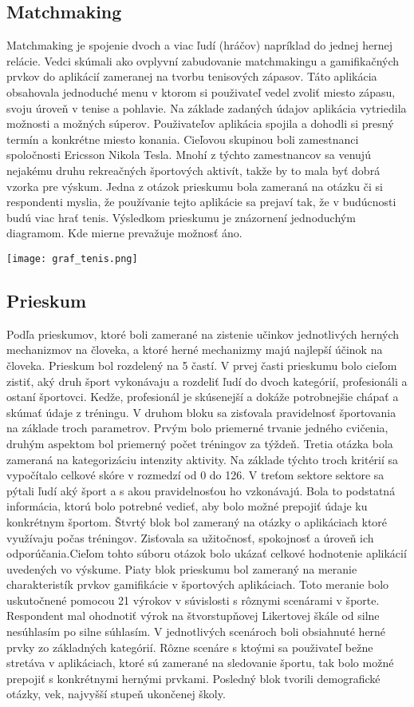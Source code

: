 \documentclass[10pt,twoside,slovak,a4paper]{article}
\begin{document}
\subsection{Matchmaking} \label{Matchmaking}
Matchmaking je spojenie dvoch a viac ľudí (hráčov) napríklad do jednej hernej relácie. Vedci skúmali ako ovplyvní zabudovanie matchmakingu a gamifikačných prvkov do aplikácií zameranej na tvorbu tenisových zápasov. Táto aplikácia obsahovala jednoduché menu v ktorom si použivateľ vedel zvoliť miesto zápasu, svoju úroveň v tenise a pohlavie. Na základe zadaných údajov aplikácia vytriedila možnosti a možných súperov. Použivateľov aplikácia spojila a dohodli si presný termín a konkrétne miesto konania.
Cieľovou skupinou boli zamestnanci spoločnosti Ericsson Nikola Tesla. Mnohí z týchto zamestnancov sa venujú nejakému druhu rekreačných športových aktivít, takže by to mala byť dobrá vzorka pre výskum. 
\newpage
Jedna z otázok prieskumu bola zameraná na otázku či si respondenti myslia, že používanie tejto aplikácie sa prejaví tak, že v budúcnosti budú viac hrať tenis. Výsledkom prieskumu je znázornení jednoduchým diagramom. Kde mierne prevažuje možnosť áno. 

\hfill \break
\texttt{[image: graf\_tenis.png]}


\subsection{Prieskum} \label{Prieskum}
Podľa prieskumov, ktoré boli zamerané na zistenie učinkov jednotlivých herných mechanizmov na človeka, a ktoré herné mechanizmy majú najlepší účinok na človeka. Prieskum bol rozdelený na 5 častí. V prvej časti prieskumu bolo cieľom zistiť, aký druh šport vykonávaju a  rozdeliť ľudí do dvoch kategórií, profesionáli a ostaní športovci. Kedže, profesionál je skúsenejší a dokáže potrobnejšie chápať a skúmať údaje z tréningu. V druhom bloku sa zisťovala pravidelnosť športovania na základe troch parametrov. Prvým bolo priemerné trvanie jedného cvičenia, druhým aspektom bol priemerný počet tréningov za týždeň. Tretia otázka bola zameraná na kategorizáciu intenzity aktivity. Na základe týchto troch kritérií sa vypočítalo celkové skóre v rozmedzí od 0 do 126. V treťom sektore sektore sa pýtali ľudí aký šport a s akou pravidelnosťou ho vzkonávajú. Bola to podstatná informácia, ktorú bolo potrebné vedieť, aby bolo možné prepojiť údaje ku konkrétnym športom. Štvrtý blok bol zameraný na otázky o aplikáciach ktoré využívaju počas tréningov. Zisťovala sa užitočnosť, spokojnosť a úroveň ich odporúčania.Cieľom tohto súboru otázok bolo ukázať celkové hodnotenie aplikácií uvedených vo výskume. Piaty blok prieskumu bol zameraný na meranie charakteristík prvkov gamifikácie v športových aplikáciach. Toto meranie bolo uskutočnené pomocou 21 výrokov v súvislosti s rôznymi scenárami v športe. Respondent mal ohodnotiť výrok na štvorstupňovej Likertovej škále od silne nesúhlasím po silne súhlasím. V jednotlivých scenároch boli obsiahnuté herné prvky zo základných kategórií. Rôzne scenáre s ktoými sa použivateľ bežne stretáva v aplikáciach, ktoré sú zamerané na sledovanie športu, tak bolo možné prepojiť s konkrétnymi hernými prvkami. 
Posledný blok tvorili demografické otázky, vek, najvyšší stupeň ukončenej školy.
\newpage
\end{document}
